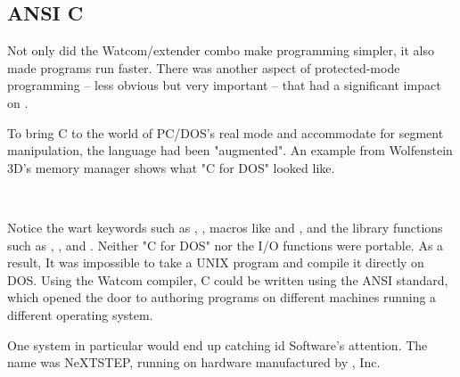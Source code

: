 \subsection{ANSI C}
Not only did the Watcom/extender combo make programming simpler, it also made programs run faster. There was another aspect of protected-mode programming -- less obvious but very important -- that had a significant impact on \doom.\\
\par
To bring C to the world of PC/DOS's real mode and accommodate for segment manipulation, the language had been "augmented". An example from Wolfenstein 3D's memory manager shows what "C for DOS" looked like.\\
\par
{}\\
\par
Notice the wart keywords such as , , macros like  and , and the  library functions such as , , and . Neither "C for DOS" nor the I/O functions were portable. As a result, It was impossible to take a UNIX program and compile it directly on DOS. Using the Watcom compiler, C could be written using the ANSI standard, which opened the door to authoring programs on different machines running a different operating system.\\
\par
One system in particular would end up catching id Software’s attention. The name was NeXTSTEP, running on hardware manufactured by \NeXTns, Inc.

